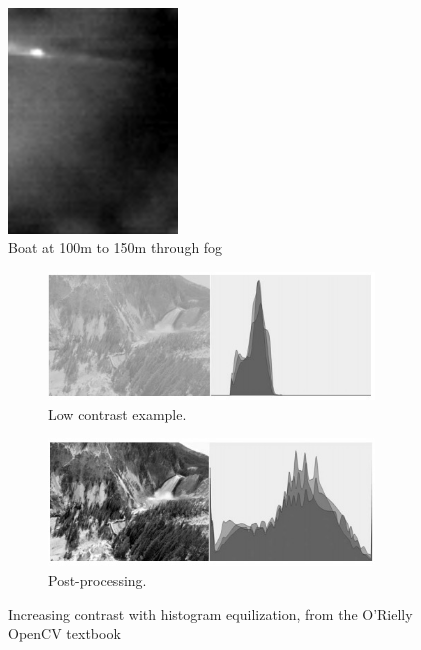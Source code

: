 \begin{figure}
\centering
\includegraphics[width=0.4\textwidth]{"./image/washed-out_example"}
\caption{Boat at 100m to 150m through fog}
\label{fig:washedOut}
\end{figure}

\begin{figure}
\centering
\begin{subfigure}{0.4\textwidth}
 \centering
 \includegraphics[width=0.95\textwidth]{"./image/hist_equil_1"}
 \caption{Low contrast example.}
 \label{fig:hist_equil:sub1}
\end{subfigure}
\begin{subfigure}{0.4\textwidth}
 \centering
 \includegraphics[width=0.95\textwidth]{"./image/hist_equil_2"}
 \caption{Post-processing.}
 \label{fig:hist_equil:sub2}
\end{subfigure}
\caption{Increasing contrast with histogram equilization, from the O'Rielly OpenCV textbook}
\label{fig:hist_equil}
\end{figure}


